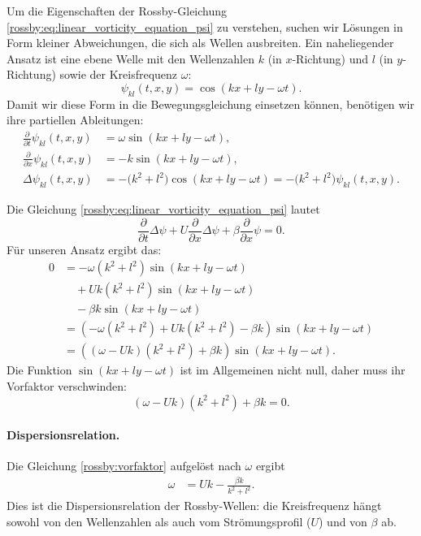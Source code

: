 Um die Eigenschaften der Rossby-Gleichung \eqref{rossby:eq:linear_vorticity_equation_psi}
zu verstehen, suchen wir Lösungen in Form kleiner Abweichungen,
die sich als Wellen ausbreiten. Ein naheliegender Ansatz ist eine
ebene Welle mit den Wellenzahlen $k$ (in $x$-Richtung) und $l$
(in $y$-Richtung) sowie der Kreisfrequenz $\omega$:
\begin{equation}
	\psi_{kl}(t,x,y) = \cos(kx + ly - \omega t).
	\label{rossby:ebenewelle}
\end{equation}
Damit wir diese Form in die Bewegungsgleichung einsetzen können,
benötigen wir ihre partiellen Ableitungen:
\begin{align*}
	\frac{\partial}{\partial t} \psi_{kl}(t,x,y)
	 & = \omega \sin(kx+ly-\omega t),
	\\[0.5em]
	\frac{\partial}{\partial x} \psi_{kl}(t,x,y)
	 & = -k \sin(kx+ly-\omega t),
	\\[0.5em]
	\Delta\psi_{kl}(t,x,y)
	 & = -\bigl(k^2+l^2\bigr)\cos(kx+ly-\omega t)
	= -\bigl(k^2+l^2\bigr)\psi_{kl}(t,x,y).
\end{align*}

Die Gleichung  \eqref{rossby:eq:linear_vorticity_equation_psi} lautet
\[
	\frac{\partial}{\partial t}\Delta \psi
	+ U \frac{\partial}{\partial x}\Delta \psi
	+ \beta \frac{\partial}{\partial x} \psi = 0.
\]
Für unseren Ansatz ergibt das:
\begin{align*}
	0
	 & = -\omega (k^2+l^2)\sin(kx+ly-\omega t)
	\\&\quad
	+ U k (k^2+l^2)\sin(kx+ly-\omega t)
	\\&\quad
	- \beta k \sin(kx+ly-\omega t)                                                      \\
	 & = \left( -\omega (k^2+l^2) + Uk (k^2+l^2) - \beta k \right) \sin(kx+ly-\omega t) \\
	 & = \left( (\omega - Uk)(k^2+l^2) + \beta k \right) \sin(kx+ly-\omega t).
\end{align*}
Die Funktion $\sin(kx+ly-\omega t)$ ist im Allgemeinen nicht null,
daher muss ihr Vorfaktor verschwinden:
\begin{equation}
	(\omega - Uk)(k^2+l^2) + \beta k = 0.
	\label{rossby:vorfaktor}
\end{equation}

\paragraph{Dispersionsrelation.}
Die Gleichung \eqref{rossby:vorfaktor} aufgelöst nach $\omega$ ergibt
\begin{align}
	\omega
	 & = Uk - \frac{\beta k}{k^2+l^2}.
	\label{rossby:dispersion}
\end{align}
Dies ist die Dispersionsrelation der Rossby-Wellen:
die Kreisfrequenz hängt sowohl von den Wellenzahlen
als auch vom Strömungsprofil ($U$) und von $\beta$ ab.


